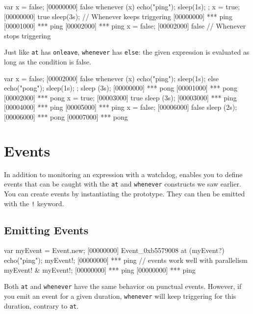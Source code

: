\begin{urbiscript}[firstnumber=1]
var x = false;
[00000000] false
whenever (x)
{
  echo("ping");
  sleep(1s);
};
x = true;
[00000000] true
sleep(3s);
// Whenever keeps triggering
[00000000] *** ping
[00001000] *** ping
[00002000] *** ping
x = false;
[00002000] false
// Whenever stops triggering
\end{urbiscript}

Just like \lstinline|at| has \lstinline|onleave|, \lstinline|whenever|
has \lstinline|else|: the given expression is evaluated as long as the
condition is false.

\begin{urbiscript}[firstnumber=1]
var x = false;
[00002000] false
whenever (x)
{
  echo("ping");
  sleep(1s);
}
else
{
  echo("pong");
  sleep(1s);
};
sleep (3s);
[00000000] *** pong
[00001000] *** pong
[00002000] *** pong
x = true;
[00003000] true
sleep (3s);
[00003000] *** ping
[00004000] *** ping
[00005000] *** ping
x = false;
[00006000] false
sleep (2s);
[00006000] *** pong
[00007000] *** pong
\end{urbiscript}

\section{Events}
\label{sec:tut:events}

In addition to monitoring an expression with a watchdog, \us enables you to
define events that can be caught with the \lstinline|at| and
\lstinline|whenever| constructs we saw earlier. You can create events by
instantiating the  prototype. They can then be emitted with
the \lstinline|!| keyword.

\subsection{Emitting Events}

\begin{urbiscript}[firstnumber=1]
var myEvent = Event.new;
[00000000] Event_0xb5579008
at (myEvent?)
  echo("ping");
myEvent!;
[00000000] *** ping
// events work well with parallelism
myEvent! & myEvent!;
[00000000] *** ping
[00000000] *** ping
\end{urbiscript}

Both \lstinline|at| and \lstinline|whenever| have the same behavior on
punctual events. However, if you emit an event for a given duration,
\lstinline|whenever| will keep triggering for this duration, contrary to
\lstinline|at|.

